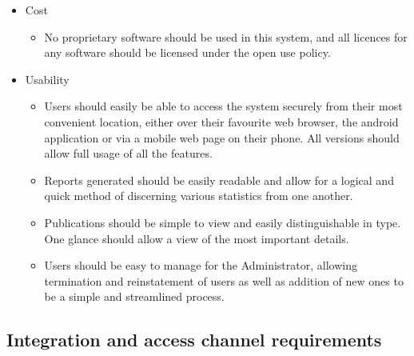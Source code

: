 \documentclass{article}
\begin{document}
\begin{itemize}
		\item Cost
		\begin{itemize}
			\item No proprietary software should be used in this system, and all licences for any software should be licensed under the open use policy.
		\end{itemize}
		\item Usability
		\begin{itemize}
			\item Users should easily be able to access the system securely from their most convenient location, either over their favourite web browser, the android application or via a mobile web page on their phone. All versions should allow full usage of all the features.
			\item Reports generated should be easily readable and allow for a logical and quick method of discerning various statistics from one another.
			\item Publications should be simple to view and easily distinguishable in type. One glance should allow a view of the most important details.
			\item Users should be easy to manage for the Administrator, allowing termination and reinstatement of users as well as addition of new ones to be a simple and streamlined process.
		\end{itemize}
	\end{itemize}
	
	\cleardoublepage
	
	\subsection{Integration and access channel requirements}\label{subsec:integration}
	
\end{document}
